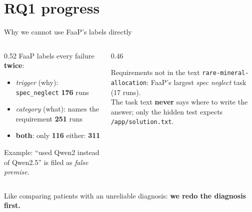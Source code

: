 \documentclass[aspectratio=169,11pt]{beamer}
\begin{document}
\section{RQ1 progress}

\begin{frame}{Why we cannot use FaaP's labels directly}
  \begin{columns}[T]
    \begin{column}{0.52\textwidth}
      FaaP labels every failure \textbf{twice}:
      \begin{itemize}
        \item \emph{trigger} (why): \texttt{spec\_neglect} \textbf{176} runs
        \item \emph{category} (what): names the requirement \textbf{251} runs
        \item \textbf{both}: only \textbf{116} \quad either: \textbf{311}
      \end{itemize}
      \vspace{4pt}
      Example: ``used Qwen2 instead of Qwen2.5'' is filed as \emph{false premise}.
    \end{column}
    \begin{column}{0.46\textwidth}
      \begin{block}{Requirements not in the text}
        \texttt{rare-mineral-allocation}: FaaP's largest \emph{spec neglect} task (17 runs).\\
        The task text \textbf{never} says where to write the answer; only the hidden test expects
        \texttt{/app/solution.txt}.
      \end{block}
    \end{column}
  \end{columns}
  \vfill
  \centering Like comparing patients with an unreliable diagnosis: \textbf{we redo the diagnosis first.}
\end{frame}
\end{document}
